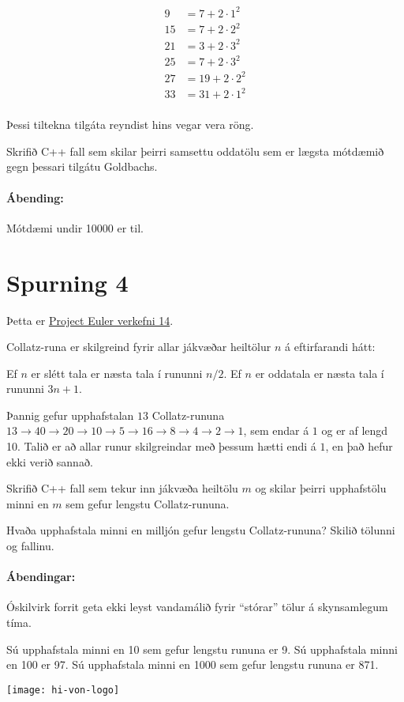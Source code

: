 \documentclass{article}
\begin{document}
\begin{align*}
9 &= 7 + 2\cdot1^2\\
15 &= 7 + 2\cdot2^2\\
21 &= 3 + 2\cdot3^2\\
25 &= 7 + 2\cdot3^2\\
27 &= 19 + 2\cdot2^2\\
33 &= 31 + 2\cdot1^2\\
\end{align*}


Þessi tiltekna tilgáta reyndist hins vegar vera röng.

Skrifið C++ fall sem skilar þeirri samsettu oddatölu sem er lægsta mótdæmið gegn þessari tilgátu Goldbachs.

\paragraph{Ábending:} Mótdæmi undir 10000 er til.

\section{Spurning 4}
Þetta er \href{https://projecteuler.net/problem=14}{Project Euler verkefni 14}.

Collatz-runa er skilgreind fyrir allar jákvæðar heiltölur $n$ á eftirfarandi hátt:

Ef $n$ er slétt tala er næsta tala í rununni $n/2$. Ef $n$ er oddatala er næsta tala í rununni $3n +1$.

Þannig gefur upphafstalan $13$ Collatz-rununa $13 \to 40 \to 20 \to 10 \to 5 \to 16 \to 8 \to 4 \to 2 \to 1$, sem endar á $1$ og er af lengd 10. Talið er að allar runur skilgreindar með þessum hætti endi á $1$, en það hefur ekki verið sannað.

Skrifið C++ fall sem tekur inn jákvæða heiltölu $m$ og skilar þeirri upphafstölu minni en $m$ sem gefur lengstu Collatz-rununa.

Hvaða upphafstala minni en milljón gefur lengstu Collatz-rununa? Skilið tölunni og fallinu.

\paragraph{Ábendingar:} Óskilvirk forrit geta ekki leyst vandamálið fyrir ``stórar'' tölur á skynsamlegum tíma.

Sú upphafstala minni en 10 sem gefur lengstu rununa er 9. Sú upphafstala minni en 100 er 97. Sú upphafstala minni en 1000 sem gefur lengstu rununa er 871.

\vfill
\texttt{[image: hi-von-logo]}
\end{document}
